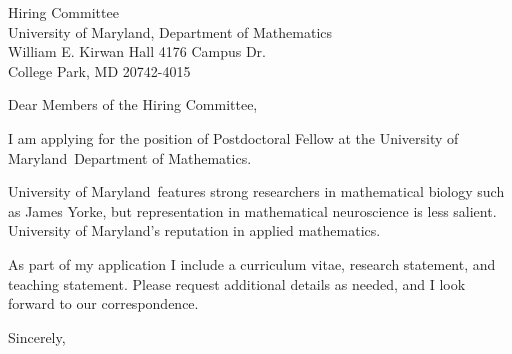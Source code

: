 \documentclass[11pt,a4paper]{letter}
\begin{document}
\def\School{University of Maryland}
\begin{letter}
{Hiring Committee\\
University of Maryland, Department of Mathematics\\
William E. Kirwan Hall 4176 Campus Dr.\\
College Park, MD 20742-4015}


\opening{Dear Members of the Hiring Committee,}

I am applying for the position of Postdoctoral Fellow at the \School~Department of Mathematics. 



\School~features strong researchers in mathematical biology such as James Yorke, but representation in mathematical neuroscience is less salient. \School's reputation in applied mathematics.



As part of my application I include a curriculum vitae, research statement, and teaching statement. Please request additional details as needed, and I look forward to our correspondence.

\closing{Sincerely,}
\end{letter}
\end{document}
